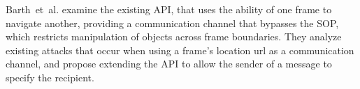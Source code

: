 Barth~et~al.\cite{barth.etal+08, barth.etal+09a} examine the existing  API, that uses the ability of one frame to navigate another, providing a communication channel that bypasses the SOP, which restricts manipulation of objects across frame boundaries.
They analyze existing attacks that occur when using a frame's location url as a communication channel, and propose extending the API to allow the sender of a message to specify the recipient.
